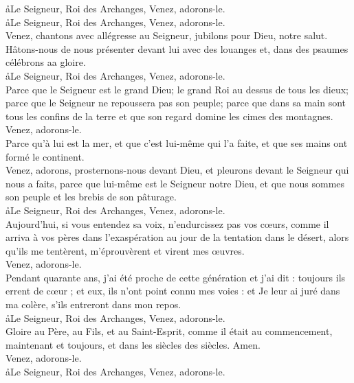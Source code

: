 \documentclass[twoside]{article}
\begin{document}
\begin{paracol}[1]{2}
\aa Le Seigneur, Roi des Archanges, \GreSpecial{*} Venez, adorons-le.\\
\aa Le Seigneur, Roi des Archanges, \GreSpecial{*} Venez, adorons-le.\\
\vv Venez, chantons avec allégresse au Seigneur, jubilons pour Dieu, notre salut.\\
\newpage
Hâtons-nous de nous présenter devant lui avec des louanges et, dans des psaumes célébrons aa gloire.\\
\aa Le Seigneur, Roi des Archanges, \GreSpecial{*} Venez, adorons-le.\\
\vv Parce que le Seigneur est le grand Dieu; le grand Roi au dessus de tous les dieux; parce que le Seigneur ne repoussera pas son peuple; parce que dans sa main sont tous les confins de la terre et que son regard domine les cimes des montagnes.\\
\GreSpecial{*} Venez, adorons-le.\\
\vv Parce qu'à lui est la mer, et que c'est lui-même qui l'a faite, et que ses mains ont formé le continent.\\
\newpage
{} Venez, adorons, prosternons-nous devant Dieu, et pleurons devant le Seigneur qui nous a faits,  parce que lui-même est le Seigneur notre Dieu, et que nous sommes son peuple et les brebis de son pâturage.\\
\aa Le Seigneur, Roi des Archanges, \GreSpecial{*} Venez, adorons-le.\\
\vv Aujourd'hui, si vous entendez sa voix, n'endurcissez pas vos cœurs, comme il arriva à vos pères dans l'exaspération au jour de la tentation dans le désert, alors qu'ils me tentèrent, m'éprouvèrent et virent mes œuvres.\\
\newpage
\GreSpecial{*} Venez, adorons-le.\\
\vv Pendant quarante ans, j'ai été proche de cette génération et j'ai dit : toujours ils errent de cœur ; et eux, ils n'ont point connu mes voies : et Je leur ai juré dans ma colère, s'ils entreront dans mon repos.\\
\aa Le Seigneur, Roi des Archanges, \GreSpecial{*} Venez, adorons-le.\\
\vv Gloire au Père, au Fils, et au Saint-Esprit, comme il était au commencement, maintenant et toujours, et dans les siècles des siècles. Amen.\\
\GreSpecial{*} Venez, adorons-le.\\
\aa Le Seigneur, Roi des Archanges, \GreSpecial{*} Venez, adorons-le.\\


\end{paracol}
\end{document}
